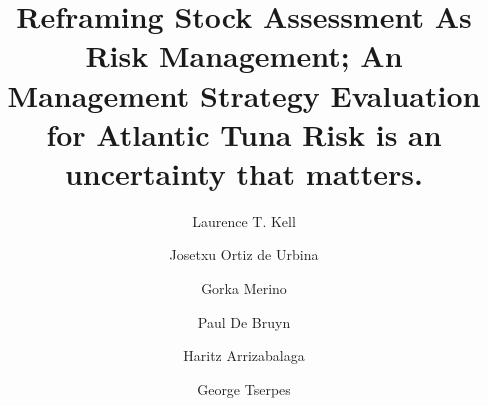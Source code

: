 \documentclass[%
nonumbib,      %
%
]{nrc1}                          %
\begin{document}





\title{Reframing Stock Assessment As Risk Management; An Management Strategy Evaluation for Atlantic Tuna
Risk is an uncertainty that matters.}

\author{Laurence T. Kell}        
\address{ICCAT Secretariat, C/Coraz\'{o}n de Mar\'{\i}a, 8. 28002 Madrid, Spain; ~Laurie.Kell@iccat.int; ~Phone: +34 914 165 600 ~Fax: +34 914 152 612.}
        
\author{Josetxu Ortiz de Urbina} 
\address{{Instituto Espa\~nol de Oceanograf\'{\i}a IEO- CO M\'{a}laga, Pto. Pesquero s/n, 29640 Fuengirola (M\'{a}laga), Spain; ~urbina@ma.ieo.es; ~Phone: +34 952 19 71 24 ~Fax: +34 952 46 38 08.}}

\author{Gorka Merino}            
\address{{AZTI-Tecnalia, Herrera Kaia Portualdea, 20110, Pasaia, Spain; ~gmerino@azti.es; ~Phone: +34 667 174 456 ~Fax: +34 94 657 25 55.}}

\author{Paul De Bruyn}           
\address{{ICCAT Secretariat, C/Coraz\'{o}n de Mar\'{\i}a, 8. 28002 Madrid, Spain.}}

\author{Haritz Arrizabalaga}     
\address{{AZTI-Tecnalia, Herrera Kaia Portualdea, 20110, Pasaia, Spain; ~gmerino@azti.es; ~Phone: +34 667 174 456 ~Fax: +34 94 657 25 55.}}

\author{George Tserpes}          
\address{{Hellenic Centre for Marine Research (HCMR), Institute of Marine biological Resources, P.O. Box 2214, 71003 Poros, Heraklion, Greece, tel: +30 2810 337851, fax: +30 2810 337820, e-mail: gtserpes@her.hcmr.gr}}





\end{document}
